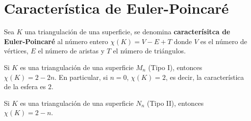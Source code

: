 \documentclass[GTSResumen.tex]{subfiles}
\begin{document}
\begin{comment}
\end{enumerate}
Esto termina la demostración. $\QED$
\end{comment}




\section{Característica de Euler-Poincaré}

\begin{defi} Sea $K$ una triangulación de una superficie, se denomina \textbf{caracterísitca de Euler-Poincaré} al número entero $\chi(K)=V-E+T$  %
donde $V$ es el número de vértices, $E$ el número de aristas y $T$ el número de triángulos. %
\end{defi}

\begin{teorema}
Si $K$ es una triangulación de una superficie $M_n$ (Tipo I), entonces $\chi(K)=2-2n$. En particular, si $n=0$, $\chi(K)=2$, es decir, la característica de la esfera es $2$.
\end{teorema}

\begin{teorema}\label{542}
Si $K$ es una triangulación de una superficie $N_n$ (Tipo II), entonces $\chi(K)=2-n$.
\end{teorema}
\end{document}
